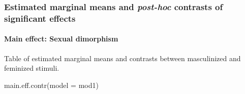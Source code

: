 \documentclass[
  bookmarksnumbered]{article}
\newenvironment{Shaded}{\begin{snugshade}}{\end{snugshade}}
\newcommand{\AttributeTok}[1]{\textcolor[rgb]{0.80,0.80,0.80}{#1}}
\newcommand{\FunctionTok}[1]{\textcolor[rgb]{0.94,0.94,0.56}{#1}}
\newcommand{\NormalTok}[1]{\textcolor[rgb]{0.80,0.80,0.80}{#1}}
\begin{document}
\begin{table}[H]
\centering
\caption{\label{tab:tab-mod1}ANOVA-type table of fixed effects for the DFF model}
\centering
{}
\end{table}

\subsubsection{\texorpdfstring{Estimated marginal means and \emph{post-hoc} contrasts of significant effects}{Estimated marginal means and post-hoc contrasts of significant effects}}\label{estimated-marginal-means-and-post-hoc-contrasts-of-significant-effects}

\paragraph{Main effect: Sexual dimorphism}\label{main-effect-sexual-dimorphism}

Table of estimated marginal means and contrasts between masculinized and feminized stimuli.

\begin{Shaded}
\begin{Highlighting}[]
\FunctionTok{main.eff.contr}\NormalTok{(}\AttributeTok{model =}\NormalTok{ mod1)}
\end{Highlighting}
\end{Shaded}
\end{document}
